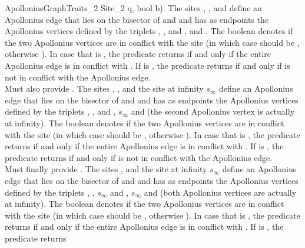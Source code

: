 \begin{ccRefConcept}{ApolloniusGraphTraits_2}
{{Site_2 q, bool b)}. The sites , ,
 and  define an Apollonius edge that lies on the
bisector of  and  and has as endpoints the Apollonius
vertices defined by the triplets , ,  and
,  and . The boolean  denotes if the
two Apollonius vertices are in conflict with the site
 (in which case  should be , otherwise
). In case that  is , the predicate
returns  if and only if the entire Apollonius edge is in
conflict with . If  is , the predicate returns
 if and only if  is not in conflict with the
Apollonius edge.
\\
%
Must also provide . The
sites , ,  and the site at infinity
$s_\infty$ define an Apollonius edge that lies on the bisector of
 and  and has as endpoints the Apollonius vertices
defined by the triplets , ,  and ,
$s_\infty$ and  (the second Apollonius vertex is actually at
infinity). The boolean  denotes if the two Apollonius vertices
are in conflict with the site  (in which case 
should be , otherwise ). 
In case that  is , the predicate
returns  if and only if the entire Apollonius edge is in
conflict with . If  is , the predicate returns
 if and only if  is not in conflict with the
Apollonius edge.
\\
%
Must finally provide . The
sites ,  and the site at infinity
$s_\infty$ define an Apollonius edge that lies on the bisector of
 and  and has as endpoints the Apollonius vertices
defined by the triplets , , $s_\infty$ and ,
$s_\infty$ and  (both Apollonius vertices are actually at
infinity). The boolean  denotes if the two Apollonius vertices
are in conflict with the site  (in which case 
should be , otherwise ). 
In case that  is , the predicate
returns  if and only if the entire Apollonius edge is in
conflict with . If  is , the predicate returns 
}
\end{ccRefConcept}
